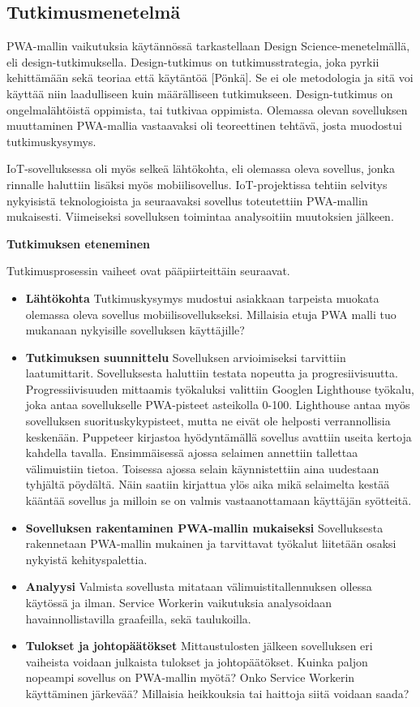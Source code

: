 \documentclass{tktltiki}
\begin{document}
\subsection{Tutkimusmenetelmä}

PWA-mallin vaikutuksia käytännössä tarkastellaan Design Science-menetelmällä, eli design-tutkimuksella. Design-tutkimus on tutkimusstrategia, joka pyrkii kehittämään sekä teoriaa että käytäntöä [Pönkä]. Se ei ole metodologia ja sitä voi käyttää niin laadulliseen kuin määrälliseen tutkimukseen. Design-tutkimus on ongelmalähtöistä oppimista, tai tutkivaa oppimista. Olemassa olevan sovelluksen muuttaminen PWA-mallia vastaavaksi oli teoreettinen tehtävä, josta muodostui tutkimuskysymys. 

IoT-sovelluksessa oli myös selkeä lähtökohta, eli olemassa oleva sovellus, jonka rinnalle haluttiin lisäksi myös mobiilisovellus. IoT-projektissa tehtiin selvitys nykyisistä teknologioista ja seuraavaksi sovellus toteutettiin PWA-mallin mukaisesti. Viimeiseksi sovelluksen toimintaa analysoitiin muutoksien jälkeen.

\textbf{Tutkimuksen eteneminen}

Tutkimusprosessin vaiheet ovat pääpiirteittäin seuraavat.

\begin{itemize}
  \item \textbf{Lähtökohta} Tutkimuskysymys mudostui asiakkaan tarpeista muokata olemassa oleva sovellus mobiilisovellukseksi. Millaisia etuja PWA malli tuo mukanaan nykyisille sovelluksen käyttäjille?
  \item \textbf{Tutkimuksen suunnittelu} Sovelluksen arvioimiseksi tarvittiin laatumittarit. Sovelluksesta haluttiin testata nopeutta ja progresiivisuutta. Progressiivisuuden mittaamis työkaluksi valittiin Googlen Lighthouse työkalu, joka antaa sovellukselle PWA-pisteet asteikolla 0-100. Lighthouse antaa myös sovelluksen suorituskykypisteet, mutta ne eivät ole helposti verrannollisia keskenään. Puppeteer kirjastoa hyödyntämällä sovellus avattiin useita kertoja kahdella tavalla. Ensimmäisessä ajossa selaimen annettiin tallettaa välimuistiin tietoa. Toisessa ajossa selain käynnistettiin aina uudestaan tyhjältä pöydältä. Näin saatiin kirjattua ylös aika mikä selaimelta kestää kääntää sovellus ja milloin se on valmis vastaanottamaan käyttäjän syötteitä. 
  \item \textbf{Sovelluksen rakentaminen PWA-mallin mukaiseksi} Sovelluksesta rakennetaan PWA-mallin mukainen ja tarvittavat työkalut liitetään osaksi nykyistä kehityspalettia.
  \item \textbf{Analyysi} Valmista sovellusta mitataan välimuistitallennuksen ollessa käytössä ja ilman. Service Workerin vaikutuksia analysoidaan havainnollistavilla graafeilla, sekä taulukoilla.
  \item \textbf{Tulokset ja johtopäätökset} Mittaustulosten jälkeen sovelluksen eri vaiheista voidaan julkaista tulokset ja johtopäätökset. Kuinka paljon nopeampi sovellus on PWA-mallin myötä? Onko Service Workerin käyttäminen järkevää? Millaisia heikkouksia tai haittoja siitä voidaan saada?
\end{itemize}
\end{document}
